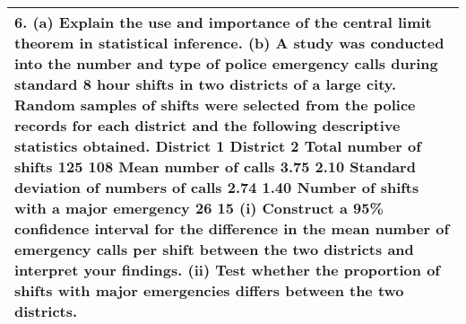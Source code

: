 \documentclass[a4paper,12pt]{article}
\begin{document}
\begin{table}[ht!]
 
\centering
 
\begin{tabular}{|p{15cm}|}
 
\hline  

6. (a) Explain the use and importance of the central limit theorem in statistical inference.
(b) A study was conducted into the number and type of police emergency calls during standard 8 hour shifts in two districts of a large city.  Random samples of shifts were selected from the police records for each district and the following descriptive statistics obtained.
District 1 District 2 Total number of shifts 125 108 Mean number of calls 3.75 2.10 Standard deviation of numbers of calls 2.74 1.40 Number of shifts with a major emergency 26 15
(i) Construct a 95\% confidence interval for the difference in the mean number of emergency calls per shift between the two districts and interpret your findings.
(ii) Test whether the proportion of shifts with major emergencies differs between the two districts.
\\ \hline
  
\end{tabular}

\end{table}
\end{document}
